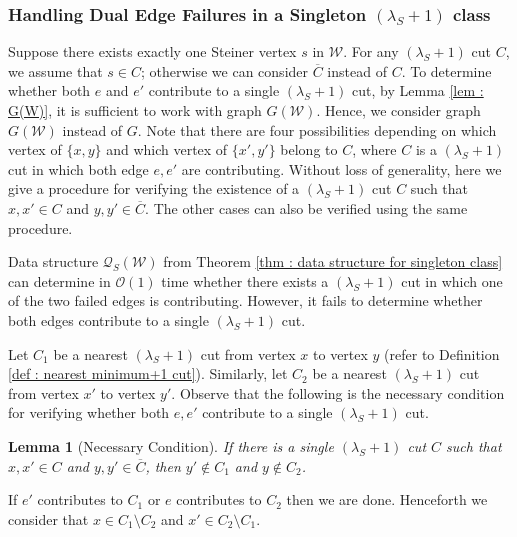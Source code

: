 \documentclass[letterpaper,11pt]{article}
\newtheorem{lemma}{Lemma}[]
\begin{document}
\subsubsection{Handling Dual Edge Failures in a Singleton $(\lambda_S+1)$ class}
Suppose there exists exactly one Steiner vertex $s$ in ${\mathcal W}$. For any $(\lambda_S+1)$ cut $C$, we assume that $s\in C$; otherwise we can consider $\overline{C}$ instead of $C$. To determine whether both $e$ and $e'$ contribute to a single $(\lambda_S+1)$ cut, by Lemma \ref{lem : G(W)}, it is sufficient to work with graph $G({\mathcal W})$. Hence, we consider graph $G({\mathcal W})$ instead of $G$.
Note that there are four possibilities depending on which vertex of $\{x,y\}$ and which vertex of $\{x',y'\}$ belong to $C$, where $C$ is a $(\lambda_S+1)$ cut in which both edge $e,e'$ are contributing. Without loss of generality, here we give a procedure for verifying the existence of a $(\lambda_S+1)$ cut $C$ such that $x,x'\in C$ and $y,y'\in \overline{C}$. The other cases can also be verified using the same procedure.

Data structure ${\mathcal Q}_S({\mathcal W})$ from Theorem \ref{thm : data structure for singleton class} can determine in ${\mathcal O}(1)$ time whether there exists a $(\lambda_S+1)$ cut in which one of the two failed edges is contributing. However, it fails to determine whether both edges contribute to a single $(\lambda_S+1)$ cut.

Let $C_1$ be a nearest $(\lambda_S+1)$ cut from vertex $x$ to vertex $y$ (refer to Definition \ref{def : nearest minimum+1 cut}). Similarly, let $C_2$ be a nearest $(\lambda_S+1)$ cut from vertex $x'$ to vertex $y'$.  Observe that the following is the necessary condition for verifying whether both $e,e'$ contribute to a single $(\lambda_S+1)$ cut.
\begin{lemma} [Necessary Condition] \label{lem : new necessary condition} 
    If there is a single $(\lambda_S+1)$ cut $C$ such that $x,x'\in C$ and $y,y'\in \overline{C}$, then $y'\notin C_1$ and $y\notin C_2$. 
\end{lemma}
If $e'$ contributes to $C_1$ or $e$ contributes to $C_2$ then we are done. Henceforth we consider that $x\in C_1\setminus C_2$ and $x'\in C_2\setminus C_1$.
\end{document}
